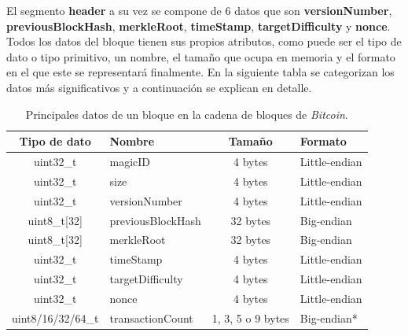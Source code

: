 \documentclass{article}
\begin{document}
    El segmento \textbf{header} a su vez se compone de 6 datos que son \textbf{versionNumber}, \textbf{previousBlockHash}, \textbf{merkleRoot}, \textbf{timeStamp}, \textbf{targetDifficulty} y \textbf{nonce}. Todos los datos del bloque tienen sus propios atributos, como puede ser el tipo de dato o tipo primitivo, un nombre, el tamaño que ocupa en memoria y el formato en el que este se representará finalmente. En la siguiente tabla se categorizan los datos más significativos y a continuación se explican en detalle.
    \begin{table}[H]
    \centering
    \begin{tabular}{| c | l | c | l |} 
        \hline
        Tipo de dato & Nombre & Tamaño & Formato \\
        \hline
        uint32\_t & magicID & 4 bytes & Little-endian \\
        \hline
        uint32\_t & size & 4 bytes & Little-endian \\
        \hline
        uint32\_t & versionNumber & 4 bytes & Little-endian \\
        \hline
        uint8\_t[32] & previousBlockHash & 32 bytes & Big-endian \\
        \hline
        uint8\_t[32] & merkleRoot & 32 bytes & Big-endian \\
        \hline
        uint32\_t & timeStamp & 4 bytes & Little-endian \\
        \hline
        uint32\_t & targetDifficulty & 4 bytes & Little-endian \\
        \hline
        uint32\_t & nonce & 4 bytes & Little-endian \\
        \hline
        uint8/16/32/64\_t & transactionCount & 1, 3, 5 o 9 bytes & Big-endian*  \\
        \hline
    \end{tabular}
    \caption{Principales datos de un bloque en la cadena de bloques de \textit{Bitcoin}.}
    \label{table:0}
    \end{table}
    
\end{document}
